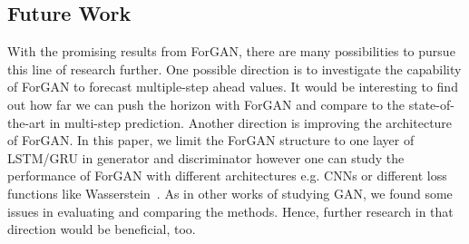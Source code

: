 \documentclass{ieeeaccess}
\begin{document}
\subsection{Future Work}
With the promising results from ForGAN, there are many possibilities to pursue this line of research further. One possible direction is to investigate the capability of ForGAN to forecast multiple-step ahead values. It would be interesting to find out how far we can push the horizon with ForGAN and compare to the state-of-the-art in multi-step prediction. Another direction is improving the architecture of ForGAN. In this paper, we limit the ForGAN structure to one layer of LSTM/GRU in generator and discriminator however one can study the performance of ForGAN with different architectures e.g. CNNs or different loss functions like Wasserstein~\cite{arjovsky2017wasserstein}. As in other works of studying GAN, we found some issues in evaluating and comparing the methods. Hence, further research in that direction would be beneficial, too.




\EOD
\end{document}
